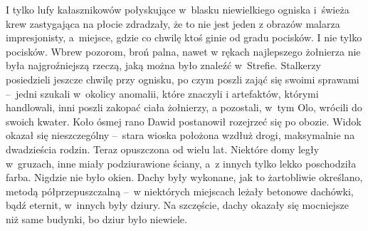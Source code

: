\documentclass[../MAIN.tex]{subfiles}
\begin{document}
I tylko lufy kałasznikowów połyskujące w~blasku
niewielkiego ogniska i~świeża krew zastygająca na płocie zdradzały, że to nie
jest jeden z obrazów malarza impresjonisty, a~miejsce, gdzie co chwilę ktoś
ginie od gradu pocisków. I nie tylko pocisków. Wbrew pozorom, broń palna, nawet
w rękach najlepszego żołnierza nie była najgroźniejszą rzeczą, jaką można było
znaleźć w~Strefie.
\pp
Stalkerzy posiedzieli jeszcze chwilę przy ognisku, po czym poszli zająć się
swoimi sprawami --~jedni szukali w~okolicy anomalii, które znaczyli i
artefaktów, którymi handlowali, inni poszli zakopać ciała żołnierzy, a
pozostali, w~tym Olo, wrócili do swoich kwater.
Koło ósmej rano Dawid postanowił
rozejrzeć się po obozie. Widok okazał się nieszczególny --~stara wioska
położona wzdłuż drogi, maksymalnie na dwadzieścia rodzin. Teraz opuszczona od
wielu lat. Niektóre domy legły w~gruzach, inne miały podziurawione ściany, a~z
innych tylko lekko poschodziła farba.
Nigdzie nie było okien. Dachy były
wykonane, jak to żartobliwie określano, metodą półprzepuszczalną --~w
niektórych miejscach leżały betonowe dachówki, bądź eternit, w~innych były
dziury. Na szczęście, dachy okazały się mocniejsze niż same budynki, bo dziur
było niewiele.
\end{document}

